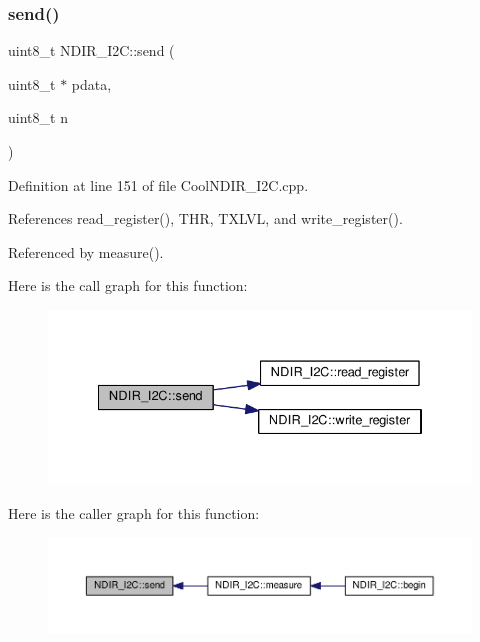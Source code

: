 \subsubsection{\texorpdfstring{send()}{send()}}
{\footnotesize\ttfamily uint8\+\_\+t N\+D\+I\+R\+\_\+\+I2\+C\+::send (\begin{DoxyParamCaption}\item[{uint8\+\_\+t $\ast$}]{pdata,  }\item[{uint8\+\_\+t}]{n }\end{DoxyParamCaption})\hspace{0.3cm}{\ttfamily [private]}}



Definition at line 151 of file Cool\+N\+D\+I\+R\+\_\+\+I2\+C.\+cpp.



References read\+\_\+register(), T\+HR, T\+X\+L\+VL, and write\+\_\+register().



Referenced by measure().

Here is the call graph for this function\+:
\nopagebreak
\begin{figure}[H]
\begin{center}
\leavevmode
\includegraphics[width=334pt]{d6/ddb/class_n_d_i_r___i2_c_aab0c04c2b7d08e99d12af044df179f0c_cgraph}
\end{center}
\end{figure}
Here is the caller graph for this function\+:
\nopagebreak
\begin{figure}[H]
\begin{center}
\leavevmode
\includegraphics[width=350pt]{d6/ddb/class_n_d_i_r___i2_c_aab0c04c2b7d08e99d12af044df179f0c_icgraph}
\end{center}
\end{figure}
\mbox{\label{class_n_d_i_r___i2_c_aa6d2b8dd287f9c9015461cebb18f9abc}} 
